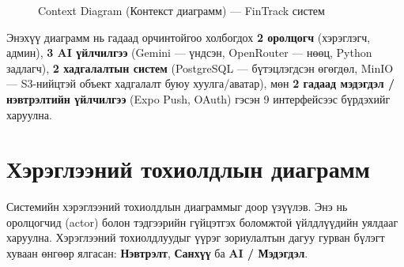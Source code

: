 \begin{figure}[ht]
{
}
\caption{Context Diagram (Контекст диаграмм) --- FinTrack систем}
\label{fig:system-context}
\end{figure}

Энэхүү диаграмм нь гадаад орчинтойгоо холбогдох \textbf{2 оролцогч} (хэрэглэгч, админ), \textbf{3 AI үйлчилгээ} (Gemini --- үндсэн, OpenRouter --- нөөц, Python задлагч), \textbf{2 хадгалалтын систем} (PostgreSQL --- бүтэцлэгдсэн өгөгдөл, MinIO --- S3-нийцтэй объект хадгалалт буюу хуулга/аватар), мөн \textbf{2 гадаад мэдэгдэл / нэвтрэлтийн үйлчилгээ} (Expo Push, OAuth) гэсэн 9 интерфейсээс бүрдэхийг харуулна.

\section{Хэрэглээний тохиолдлын диаграмм}
Системийн хэрэглээний тохиолдлын диаграммыг доор үзүүлэв. Энэ нь оролцогчид (actor) болон тэдгээрийн гүйцэтгэх боломжтой үйлдлүүдийн уялдааг харуулна. Хэрэглээний тохиолдлуудыг үүрэг зориулалтын дагуу гурван бүлэгт хуваан өнгөөр ялгасан: \textcolor{accentblue!80!black}{\textbf{Нэвтрэлт}}, \textcolor{accentgreen!60!black}{\textbf{Санхүү}} ба \textcolor{accentpurple!80!black}{\textbf{AI / Мэдэгдэл}}.

